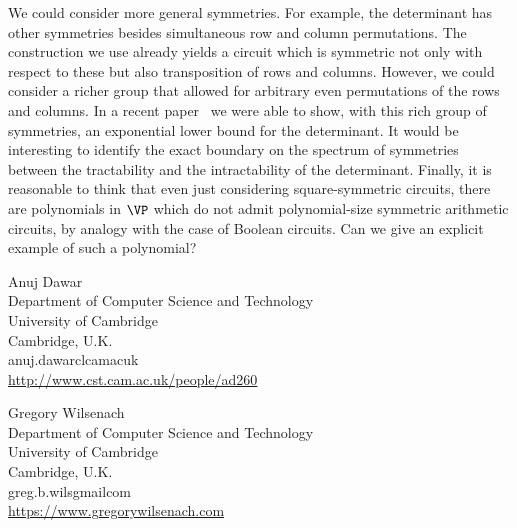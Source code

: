 \documentclass{toc}
\begin{document}
We could consider more general symmetries. For example, the determinant has
other symmetries besides simultaneous row and column permutations. The
construction we use already yields a circuit which is symmetric not only with
respect to these but also transposition of rows and columns.  However, we could
consider a richer group that allowed for arbitrary even permutations of the rows
and columns.  %
In a recent paper~\cite{DWitcs22}  %
we %
were %
able to show, with this rich
group of symmetries, an exponential lower bound for the determinant.  It would be interesting to identify the exact boundary on the spectrum of symmetries between the tractability and the intractability of the determinant.
Finally, it is reasonable to think that even just considering
square-symmetric %
circuits, there are polynomials in $\VP$ which do
not admit polynomial-size symmetric arithmetic circuits, by analogy with the
case of Boolean circuits.  Can we give an explicit example of such a polynomial?
%
%
%
%

%
%
%
%
%
\begin{tocauthors}
\begin{tocinfo}[dawar]
 Anuj Dawar\\
  Department of Computer Science and Technology \\
 University of Cambridge\\
Cambridge, U.K.\\
anuj.dawar\tocat{}cl\tocdot{}cam\tocdot{}ac\tocdot{}uk \\   %
 \url{http://www.cst.cam.ac.uk/people/ad260}      %
\end{tocinfo}
\begin{tocinfo}[wilsenach]
 Gregory Wilsenach\\
 Department of Computer Science and Technology \\
 University of Cambridge\\
 Cambridge, U.K.\\
 greg.b.wils\tocat{}gmail\tocdot{}com\\ %
  \url{https://www.gregorywilsenach.com}
\end{tocinfo}
\end{tocauthors}
%
%
%
%
%
%
%
%
%
%
%
%
%
%
%
%
%
%
%
%
\end{document}

